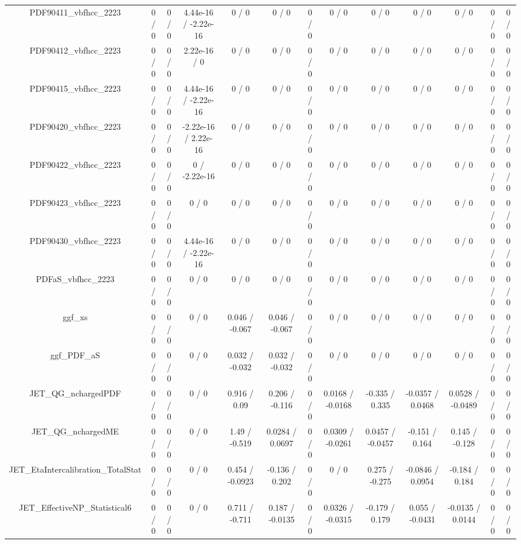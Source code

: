 \documentclass[10pt]{article}
\begin{document}
\begin{table}[htbp]
\begin{center}
\begin{tabular}{|c|c|c|c|c|c|c|c|c|c|c|c|c|}
  PDF90411_vbfhcc_2223 & 0 / 0 & 0 / 0 & 4.44e-16 / -2.22e-16 & 0 / 0 & 0 / 0 & 0 / 0 & 0 / 0 & 0 / 0 & 0 / 0 & 0 / 0 & 0 / 0 & 0 / 0 \\ 
  PDF90412_vbfhcc_2223 & 0 / 0 & 0 / 0 & 2.22e-16 / 0 & 0 / 0 & 0 / 0 & 0 / 0 & 0 / 0 & 0 / 0 & 0 / 0 & 0 / 0 & 0 / 0 & 0 / 0 \\ 
  PDF90415_vbfhcc_2223 & 0 / 0 & 0 / 0 & 4.44e-16 / -2.22e-16 & 0 / 0 & 0 / 0 & 0 / 0 & 0 / 0 & 0 / 0 & 0 / 0 & 0 / 0 & 0 / 0 & 0 / 0 \\ 
  PDF90420_vbfhcc_2223 & 0 / 0 & 0 / 0 & -2.22e-16 / 2.22e-16 & 0 / 0 & 0 / 0 & 0 / 0 & 0 / 0 & 0 / 0 & 0 / 0 & 0 / 0 & 0 / 0 & 0 / 0 \\ 
  PDF90422_vbfhcc_2223 & 0 / 0 & 0 / 0 & 0 / -2.22e-16 & 0 / 0 & 0 / 0 & 0 / 0 & 0 / 0 & 0 / 0 & 0 / 0 & 0 / 0 & 0 / 0 & 0 / 0 \\ 
  PDF90423_vbfhcc_2223 & 0 / 0 & 0 / 0 & 0 / 0 & 0 / 0 & 0 / 0 & 0 / 0 & 0 / 0 & 0 / 0 & 0 / 0 & 0 / 0 & 0 / 0 & 0 / 0 \\ 
  PDF90430_vbfhcc_2223 & 0 / 0 & 0 / 0 & 4.44e-16 / -2.22e-16 & 0 / 0 & 0 / 0 & 0 / 0 & 0 / 0 & 0 / 0 & 0 / 0 & 0 / 0 & 0 / 0 & 0 / 0 \\ 
  PDFaS_vbfhcc_2223 & 0 / 0 & 0 / 0 & 0 / 0 & 0 / 0 & 0 / 0 & 0 / 0 & 0 / 0 & 0 / 0 & 0 / 0 & 0 / 0 & 0 / 0 & 0 / 0 \\ 
  ggf_xs & 0 / 0 & 0 / 0 & 0 / 0 & 0.046 / -0.067 & 0.046 / -0.067 & 0 / 0 & 0 / 0 & 0 / 0 & 0 / 0 & 0 / 0 & 0 / 0 & 0 / 0 \\ 
  ggf_PDF_aS & 0 / 0 & 0 / 0 & 0 / 0 & 0.032 / -0.032 & 0.032 / -0.032 & 0 / 0 & 0 / 0 & 0 / 0 & 0 / 0 & 0 / 0 & 0 / 0 & 0 / 0 \\ 
  JET_QG_nchargedPDF & 0 / 0 & 0 / 0 & 0 / 0 & 0.916 / 0.09 & 0.206 / -0.116 & 0 / 0 & 0.0168 / -0.0168 & -0.335 / 0.335 & -0.0357 / 0.0468 & 0.0528 / -0.0489 & 0 / 0 & 0 / 0 \\ 
  JET_QG_nchargedME & 0 / 0 & 0 / 0 & 0 / 0 & 1.49 / -0.519 & 0.0284 / 0.0697 & 0 / 0 & 0.0309 / -0.0261 & 0.0457 / -0.0457 & -0.151 / 0.164 & 0.145 / -0.128 & 0 / 0 & 0 / 0 \\ 
  JET_EtaIntercalibration_TotalStat & 0 / 0 & 0 / 0 & 0 / 0 & 0.454 / -0.0923 & -0.136 / 0.202 & 0 / 0 & 0 / 0 & 0.275 / -0.275 & -0.0846 / 0.0954 & -0.184 / 0.184 & 0 / 0 & 0 / 0 \\ 
  JET_EffectiveNP_Statistical6 & 0 / 0 & 0 / 0 & 0 / 0 & 0.711 / -0.711 & 0.187 / -0.0135 & 0 / 0 & 0.0326 / -0.0315 & -0.179 / 0.179 & 0.055 / -0.0431 & -0.0135 / 0.0144 & 0 / 0 & 0 / 0 \\ 

\end{tabular}
\end{center}
\end{table}
\end{document}
